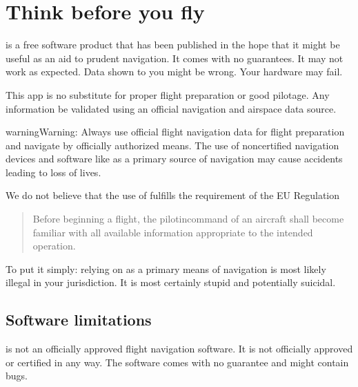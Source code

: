 \documentclass[letterpaper,10pt,english]{sphinxmanual}
\begin{document}
\chapter{Think before you fly}
\label{\detokenize{01-intro/01-think:think-before-you-fly}}\label{\detokenize{01-intro/01-think::doc}}
\sphinxAtStartPar
{} is a free software product that has been published
in the hope that it might be useful as an aid to prudent navigation.  It comes
with no guarantees.  It may not work as expected.  Data shown to you might be
wrong.  Your hardware may fail.

\sphinxAtStartPar
This app is no substitute for proper flight preparation or good pilotage.  Any
information  be validated using an official navigation and
airspace data source.

\begin{sphinxadmonition}{warning}{Warning:}
\sphinxAtStartPar
Always use official flight navigation data for flight preparation
and navigate by officially authorized means. The use of non\sphinxhyphen{}certified
navigation devices and software like  as a
primary source of navigation may cause accidents leading to loss of lives.
\end{sphinxadmonition}

\sphinxAtStartPar
We do not believe that the use of  fulfills the
requirement of the EU Regulation %
\begin{footnote}[3]\sphinxAtStartFootnote
{}
%
\end{footnote}
\begin{quote}

\sphinxAtStartPar
Before beginning a flight, the pilot\sphinxhyphen{}in\sphinxhyphen{}command of an aircraft shall become
familiar with all available information appropriate to the intended operation.
\end{quote}

\sphinxAtStartPar
To put it simply: relying on  as a primary means of
navigation is most likely illegal in your jurisdiction.  It is most certainly
stupid and potentially suicidal.


\section{Software limitations}
\label{\detokenize{01-intro/01-think:software-limitations}}
\sphinxAtStartPar
{} is not an officially approved flight navigation
software.  It is not officially approved or certified in any way.  The software
comes with no guarantee and might contain bugs.
\end{document}

